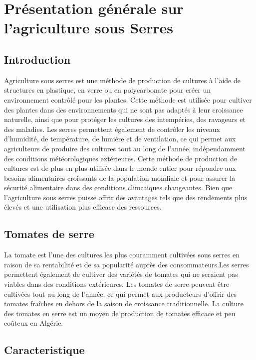 \chapter{Présentation générale sur l’agriculture sous Serres} \label{chap:Présentation générale sur l’agriculture sous Serres}

\section{Introduction}
Agriculture sous serres est une méthode de production de cultures à l'aide de structures en plastique, en verre ou en polycarbonate pour créer un environnement contrôlé pour les plantes. Cette méthode est utilisée pour cultiver des plantes dans des environnements qui ne sont pas adaptés à leur croissance naturelle, ainsi que pour protéger les cultures des intempéries, des ravageurs et des maladies.
Les serres permettent également de contrôler les niveaux d'humidité, de température, de lumière et de ventilation, ce qui permet aux agriculteurs de produire des cultures tout au long de l'année, indépendamment des conditions météorologiques extérieures. Cette méthode de production de cultures est de plus en plus utilisée dans le monde entier pour répondre aux besoins alimentaires croissants de la population mondiale et pour assurer la sécurité alimentaire dans des conditions climatiques changeantes.
Bien que l'agriculture sous serres puisse offrir des avantages tels que des rendements plus élevés et une utilisation plus efficace des ressources.

\section{Tomates de serre }
La tomate est l'une des cultures les plus couramment cultivées sous serres en raison de sa rentabilité et de sa popularité auprès des consommateurs.Les serres permettent également de cultiver des variétés de tomates qui ne seraient pas viables dans des conditions extérieures. Les tomates de serre peuvent être cultivées tout au long de l'année, ce qui permet aux producteurs d'offrir des tomates fraîches en dehors de la saison de croissance traditionnelle.
La culture des tomates en serre est un moyen de production de tomates efficace et peu
coûteux en Algérie.
\section{Caracteristique}
